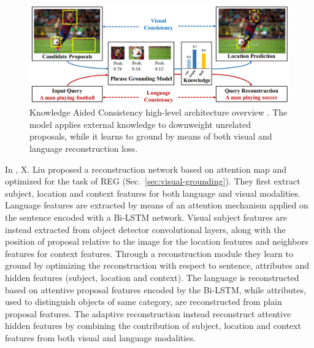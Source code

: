 \begin{figure}
  \centering
  \includegraphics[width=.8\textwidth]{figures/kac-example.png}
  \caption[Knowledge Aided Consistency high-level architecture
  overview]{ Knowledge Aided Consistency high-level architecture
  overview \cite{chen2018knowledge}. The model applies external
  knowledge to downweight unrelated proposals, while it learns to
  ground by means of both visual and language reconstruction loss. }
  \label{fig:kac-example}
\end{figure}

In \cite{liu2019adaptive}, X. Liu \etal{} proposed a reconstruction
network based on attention map and optimized for the task of REG
(Sec.~\ref{sec:visual-grounding}). They first extract subject,
location and context features for both language and visual modalities.
Language features are extracted by means of an attention mechanism
applied on the sentence encoded with a Bi-LSTM network. Visual subject
features are instead extracted from object detector convolutional
layers, along with the position of proposal relative to the image for
the location features and neighbors features for context features.
Through a reconstruction module they learn to ground by optimizing
the reconstruction with respect to sentence, attributes and hidden
features (subject, location and context). The language is
reconstructed based on attentive proposal features encoded by the
Bi-LSTM, while attributes, used to distinguish objects of same
category, are reconstructed from plain proposal features. The adaptive
reconstruction instead reconstruct attentive hidden features by
combining the contribution of subject, location and context features
from both visual and language modalities.

